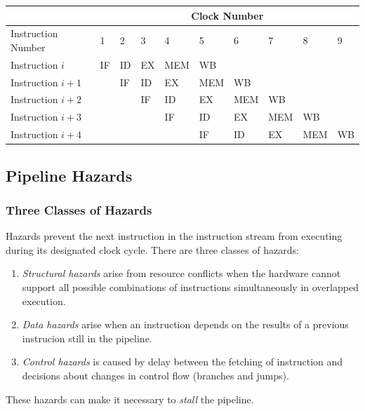 \documentclass[12pt, a4paper]{article}
\theoremstyle{margin}
\begin{document}
	  \begin{table}[H]
	  \centering
	  \begin{tabular}{|l|l|l|l|l|l|l|l|l|l|}
	  \hline
						 & \multicolumn{9}{c|}{Clock Number}               \\ \hline
	  Instruction Number & 1  & 2  & 3  & 4   & 5   & 6   & 7   & 8   & 9  \\ \hline
	  Instruction $i$    & IF & ID & EX & MEM & WB  &     &     &     &    \\ \hline
	  Instruction $i+1$  &    & IF & ID & EX  & MEM & WB  &     &     &    \\ \hline
	  Instruction $i+2$  &    &    & IF & ID  & EX  & MEM & WB  &     &    \\ \hline
	  Instruction $i+3$  &    &    &    & IF  & ID  & EX  & MEM & WB  &    \\ \hline
	  Instruction $i+4$  &    &    &    &     & IF  & ID  & EX  & MEM & WB \\ \hline
	  \end{tabular}
	  \end{table}

  \subsection{Pipeline Hazards}
	\subsubsection{Three Classes of Hazards}

	  Hazards prevent the next instruction in the instruction stream from executing during its designated clock cycle. There are three classes of hazards\cite{caqa}:
	  \begin{enumerate}
		\item \emph{Structural hazards} arise from resource conflicts when the hardware cannot support all possible combinations of instructions simultaneously in overlapped execution.
		\item \emph{Data hazards} arise when an instruction depends on the results of a previous instrucion still in the pipeline.
		\item \emph{Control hazards} is caused by delay between the fetching of instruction and decisions about changes in control flow (branches and jumps).
	  \end{enumerate}

	  These hazards can make it necessary to \emph{stall} the pipeline.
\end{document}
